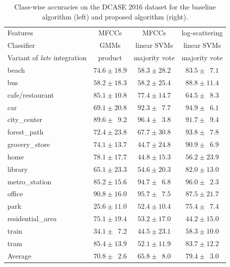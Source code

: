 \documentclass[journal]{IEEEtran}
\begin{document}
\begin{table}
\begin{center}
\caption{Class-wise accuracies on the DCASE 2016 dataset for the baseline algorithm (left) and proposed algorithm (right).\label{table:dcase2016}}
\begin{tabular}{lccc}
Features & MFCCs & MFCCs & log-scattering \\
Classifier  & GMMs & linear SVMs & linear SVMs \\
Variant of \emph{late} integration & product & majority vote & majority vote \\
\midrule
beach & $74.6 \pm 18.9$ & $58.3 \pm 28.2$ & $83.5 \pm \phantom{0}7.1$ \\
bus & $58.2 \pm 18.3$ & $58.2 \pm 25.4$ & $88.8 \pm 11.4$ \\
cafe/restaurant & $85.1 \pm 10.8$ & $77.4 \pm 14.7$ & $64.5 \pm \phantom{0}8.3$ \\
car & $69.1 \pm 20.8$ & $92.3 \pm \phantom{0}7.7$ & $94.9 \pm \phantom{0}6.1$ \\
city\_center & $89.6 \pm \phantom{0}9.2$ & $96.4 \pm \phantom{0}3.8$ & $91.7 \pm \phantom{0}9.4$ \\
forest\_path & $72.4 \pm 23.8$ & $67.7 \pm 30.8$ & $93.8 \pm \phantom{0}7.8$ \\
grocery\_store & $74.1 \pm 13.7$ & $44.7 \pm 24.8$ & $90.9 \pm \phantom{0}6.9$ \\
home & $78.1 \pm 17.7$ & $44.8 \pm 15.3$ & $56.2 \pm 23.9$ \\
library & $65.1 \pm 23.3$ & $54.6 \pm 20.3$ & $82.0 \pm 13.0$ \\
metro\_station & $85.2 \pm 15.6$ & $94.7 \pm \phantom{0}6.8$ & $96.0 \pm \phantom{0}2.3$ \\
office & $90.8 \pm 16.0$ & $95.7 \pm \phantom{0}7.5$ & $87.5 \pm 21.7$ \\
park & $25.6 \pm 11.0$ & $52.4 \pm 10.4$ & $75.4 \pm \phantom{0}7.4$ \\
residential\_area & $75.1 \pm 19.4$ & $53.2 \pm 17.0$ & $44.2 \pm 15.0$ \\
train & $34.1 \pm \phantom{0}7.2$ & $44.5 \pm 23.1$ & $58.3 \pm 10.0$ \\
tram & $85.4 \pm 13.9$ & $52.1 \pm 11.9$ & $83.7 \pm 12.2$ \\
\bottomrule
Average & $70.8 \pm \phantom{0}2.6$ & $65.8 \pm \phantom{0}8.0$ & $79.4 \pm \phantom{0}3.0$ \\
\end{tabular}
\end{center}

\end{table}
\end{document}
